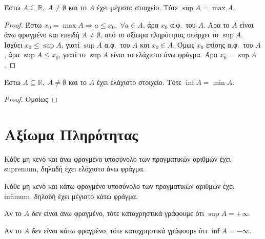\begin{mybox3}
\begin{prop}
  Έστω $ A \subseteq \mathbb{R}, \; A \neq \emptyset $ και το $A$ έχει μέγιστο 
  στοιχείο. Τότε $ \sup A = \max A $.
\end{prop}
\end{mybox3}
\begin{proof}
\item {}
  Έστω $ x_{0} = \max A \Rightarrow a \leq x_{0}, \; \forall a \in A $, άρα $ x_{0} $ α.φ.\
  του $A$. Άρα το $A$ είναι άνω φραγμένο και επειδή $ A \neq \emptyset $, από το αξίωμα
  πληρότητας υπάρχει το $ \sup A $. 
  Ισχύει $ x_{0} \leq \sup A $, γιατί $ \sup A $ α.φ.\ του $A$ και $ x_{0} \in A $.
  Όμως $ x_{0} $ επίσης α.φ.\ του $A$, άρα $ \sup A \leq x_{0} $, γιατί το $ \sup A $
  είναι το ελάχιστο άνω φράγμα.
  Άρα $ x_{0}= \sup A $.
\end{proof}

\begin{mybox3}
\begin{prop}
  Έστω $ A \subseteq \mathbb{R}, \; A \neq \emptyset $ και το $A$ έχει ελάχιστο
  στοιχείο. Τότε $ \inf A = \min A $.
\end{prop}
\end{mybox3}
\begin{proof}
  Ομοίως 
\end{proof}


\section{Αξίωμα Πληρότητας}

\begin{myitemize}
  \item Κάθε μη κενό και άνω φραγμένο υποσύνολο των πραγματικών αριθμών έχει 
    supremum, δηλαδή έχει ελάχιστο άνω φράγμα.
  \item Κάθε μη κενό και κάτω  φραγμένο υποσύνολο των πραγματικών αριθμών έχει 
    infimum, δηλαδή έχει μέγιστο κάτω φράγμα.
\end{myitemize}

\begin{rem}
\item {}
  \begin{myitemize}
    \item Αν το $A$ δεν είναι άνω φραγμένο, τότε καταχρηστικά  γράφουμε ότι 
      $ \sup A = + \infty $.
    \item Αν το $A$ δεν είναι κάτω φραγμένο, τότε καταχρηστικά  γράφουμε ότι 
      $ \inf A = - \infty $.
  \end{myitemize}
\end{rem}

